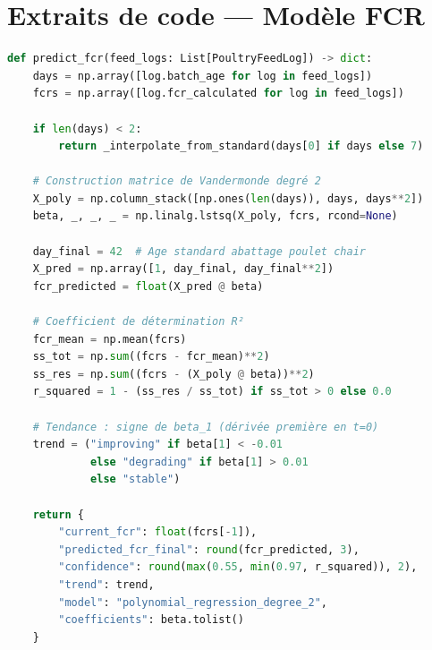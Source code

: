 \chapter{Extraits de code — Modèle FCR}
\label{ann:fcr_code}

\begin{lstlisting}[language=python, caption={Implémentation de la régression polynomiale FCR}]
def predict_fcr(feed_logs: List[PoultryFeedLog]) -> dict:
    days = np.array([log.batch_age for log in feed_logs])
    fcrs = np.array([log.fcr_calculated for log in feed_logs])

    if len(days) < 2:
        return _interpolate_from_standard(days[0] if days else 7)

    # Construction matrice de Vandermonde degré 2
    X_poly = np.column_stack([np.ones(len(days)), days, days**2])
    beta, _, _, _ = np.linalg.lstsq(X_poly, fcrs, rcond=None)

    day_final = 42  # Age standard abattage poulet chair
    X_pred = np.array([1, day_final, day_final**2])
    fcr_predicted = float(X_pred @ beta)

    # Coefficient de détermination R²
    fcr_mean = np.mean(fcrs)
    ss_tot = np.sum((fcrs - fcr_mean)**2)
    ss_res = np.sum((fcrs - (X_poly @ beta))**2)
    r_squared = 1 - (ss_res / ss_tot) if ss_tot > 0 else 0.0

    # Tendance : signe de beta_1 (dérivée première en t=0)
    trend = ("improving" if beta[1] < -0.01
             else "degrading" if beta[1] > 0.01
             else "stable")

    return {
        "current_fcr": float(fcrs[-1]),
        "predicted_fcr_final": round(fcr_predicted, 3),
        "confidence": round(max(0.55, min(0.97, r_squared)), 2),
        "trend": trend,
        "model": "polynomial_regression_degree_2",
        "coefficients": beta.tolist()
    }
\end{lstlisting}

